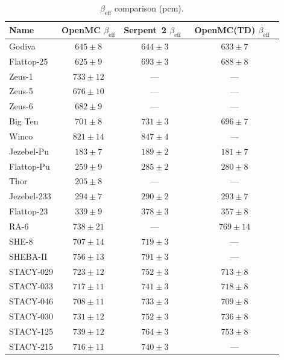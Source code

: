 \documentclass[12pt,preprint]{elsarticle}
\begin{document}
\begin{table}[H]
\centering
\caption{$\beta_{\mathrm{eff}}$ comparison (pcm).}
\label{tab:lit_beff}
\small
\begin{tabular}{@{}lccc@{}}
\toprule
Name & OpenMC $\beta_{\mathrm{eff}}$ & Serpent~2 $\beta_{\mathrm{eff}}$~\cite{leppanen2014} & OpenMC(TD) $\beta_{\mathrm{eff}}$~\cite{romero2022} \\
\midrule
Godiva       & $645 \pm 8$        & $644 \pm 3$    & $633 \pm 7$    \\
Flattop-25   & $625 \pm 9$        & $693 \pm 3$    & $688 \pm 8$    \\
Zeus-1       & $733 \pm 12$       & ---            & ---            \\
Zeus-5       & $676 \pm 10$       & ---            & ---            \\
Zeus-6       & $682 \pm 9$        & ---            & ---            \\
Big Ten      & $701 \pm 8$        & $731 \pm 3$    & $696 \pm 7$    \\
Winco        & $821 \pm 14$       & $847 \pm 4$    & ---            \\
Jezebel-Pu   & $183 \pm 7$        & $189 \pm 2$    & $181 \pm 7$    \\
Flattop-Pu   & $259 \pm 9$        & $285 \pm 2$    & $280 \pm 8$    \\
Thor         & $205 \pm 8$        & ---            & ---            \\
Jezebel-233  & $294 \pm 7$        & $290 \pm 2$    & $293 \pm 7$    \\
Flattop-23   & $339 \pm 9$        & $378 \pm 3$    & $357 \pm 8$    \\
RA-6         & $738 \pm 21$       & ---            & $769 \pm 14$   \\
SHE-8        & $707 \pm 14$       & $719 \pm 3$    & ---            \\
SHEBA-II     & $756 \pm 13$       & $791 \pm 3$    & ---            \\
STACY-029    & $723 \pm 12$       & $752 \pm 3$    & $713 \pm 8$    \\
STACY-033    & $717 \pm 11$       & $741 \pm 3$    & $718 \pm 8$    \\
STACY-046    & $708 \pm 11$       & $733 \pm 3$    & $709 \pm 8$    \\
STACY-030    & $731 \pm 12$       & $752 \pm 3$    & $736 \pm 8$    \\
STACY-125    & $739 \pm 12$       & $764 \pm 3$    & $753 \pm 8$    \\
STACY-215    & $716 \pm 11$       & $740 \pm 3$    & ---            \\
\bottomrule
\end{tabular}
\end{table}
\end{document}
